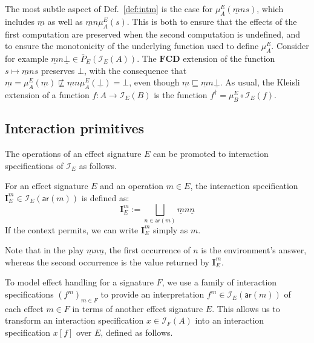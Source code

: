 \documentclass[sigplan,screen]{acmart}
\newcommand{\kw}[1]{\ensuremath{ \mathsf{#1} }}
\begin{document}
The most subtle aspect of Def.~\ref{def:intm}
is the case for $\mu^E_A(\underline{m} n s)$,
which includes $\underline{m}$ as well as $\underline{m} n \mu^E_A(s)$.
This is both
to ensure that the effects of the first computation are preserved
when the second computation is undefined, and
to ensure the monotonicity of the underlying function
used to define $\mu^E_A$.
Consider for example
$\underline{m} n \underline{\bot} \in \bar{P}_E(\mathcal{I}_E(A))$.
The $\mathbf{FCD}$ extension
of the function $s \mapsto \underline{m} n s$
preserves $\bot$,
with the consequence that
$\underline{m} = \mu^E_A(\underline{m}) \nsqsubseteq
 \underline{m} n \mu^E_A(\underline{\bot}) = \bot$,
even though
$\underline{m} \sqsubseteq \underline{m} n \underline{\bot}$.
%
As usual,
the Kleisli extension of a function $f : A \rightarrow \mathcal{I}_E(B)$
is the function $f^\dagger = \mu^E_B \circ \mathcal{I}_E(f)$.


\subsection{Interaction primitives} %

The operations of an effect signature $E$
can be promoted to interaction specifications of $\mathcal{I}_E$
as follows.

\begin{definition}
For an effect signature $E$ and
an operation $m \in E$,
the interaction specification
$\mathbf{I}_E^m \in \mathcal{I}_E(\kw{ar}(m))$
is defined as:
\[
  \mathbf{I}_E^m :=
    \bigsqcup_{n \in \kw{ar}(m)} \underline{m} n \underline{n}
\]
If the context permits,
we can write $\mathbf{I}_E^m$ simply as $m$.
\end{definition}
Note that in the play $\underline{m} n \underline{n}$,
the first occurrence of $n$ is the environment's answer,
whereas the second occurrence is the value returned by $\mathbf{I}_E^m$.

To model effect handling for a signature $F$,
we use a family of interaction specifications
$(f^m)_{m \in F}$
to provide an interpretation $f^m \in \mathcal{I}_E(\kw{ar}(m))$
of each effect $m \in F$
in terms of another effect signature $E$.
This allows us to transform an interaction specification
$x \in \mathcal{I}_F(A)$
into an interaction specification
$x[f]$ over $E$,
defined as follows.
\end{document}

